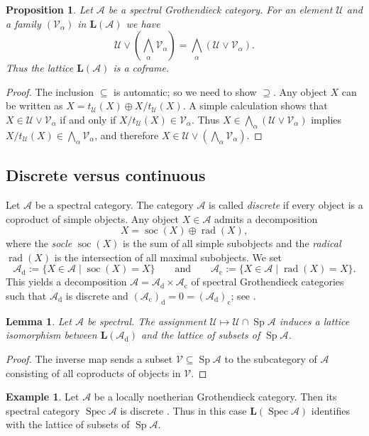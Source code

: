 \documentclass[a4paper]{amsart}
\theoremstyle{plain}
\newtheorem{prop}[thm]{Proposition}
\newtheorem{lem}[thm]{Lemma}
\theoremstyle{definition}
\newtheorem{exm}[thm]{Example}
\theoremstyle{remark}
\numberwithin{equation}{section}
\newcommand{\rad}{\operatorname{rad}}
\newcommand{\soc}{\operatorname{soc}}
\newcommand{\Sp}{\operatorname{Sp}}
\newcommand{\Spec}{\operatorname{Spec}}
\def\A{\mathcal A}
\def\U{\mathcal U}
\def\V{\mathcal V}
\def\bfL{\mathbf L}
\def\a{\alpha}
\begin{document}
\begin{prop}\label{pr:lattice-loc-spec}
  Let $\A$ be a spectral Grothendieck category. For an element $\U$ and a family $(\V_\a)$ in
  $\bfL(\A)$ we have
  \[
    \U\vee\left(\bigwedge_\a\V_\a\right)=\bigwedge_\a(\U\vee\V_\a).\]
  Thus the lattice $\bfL(\A)$ is a coframe.
\end{prop}
\begin{proof}
  The inclusion $\subseteq$ is automatic; so we need to show
  $\supseteq$. Any object $X$ can be written as
  $X=t_\U(X)\oplus X/t_\U(X)$. A simple calculation shows that
  $X\in\U\vee\V_\a$ if and only if $X/t_\U(X)\in\V_\a$. Thus
  $X\in\bigwedge_\a(\U\vee\V_\a)$ implies
  $X/t_\U(X)\in\bigwedge_\a\V_\a$, and therefore
  $X\in \U\vee\left(\bigwedge_\a\V_\a\right)$.
\end{proof}

\subsection*{Discrete versus continuous}

Let $\A$ be a spectral category. The category $\A$ is called
\emph{discrete} if every object is a coproduct of simple objects. Any
object $X\in\A$ admits a decomposition \[X=\soc(X)\oplus\rad(X),\] where the
\emph{socle} $\soc(X)$ is the sum of all simple subobjects and the
\emph{radical} $\rad(X)$ is the intersection of all maximal
subobjects. We set
\[\A_{\mathrm d}:=\{X\in\A\mid\soc(X)=X\}\qquad\text{and}\qquad
  \A_{\mathrm c}:=\{X\in\A\mid\rad(X)=X\}.\] This yields a
decomposition $\A=\A_{\mathrm d}\times \A_{\mathrm c}$ of spectral
Grothendieck categories such that $\A_{\mathrm d}$ is discrete and
$(\A_{\mathrm c})_{\mathrm d}=0=(\A_{\mathrm d})_{\mathrm c}$; see  \cite[\S3]{GO1966}.

\begin{lem}\label{le:discrete}
  Let $\A$ be spectral. The assignment $\U\mapsto\U\cap\Sp\A$ induces
  a lattice isomorphism between $\bfL(\A_{\mathrm d})$ and the lattice
  of subsets of $\Sp\A$.
\end{lem}
\begin{proof}
  The inverse map sends a subset $\V\subseteq\Sp\A$ to the subcategory
  of $\A$ consisting of all coproducts of objects in $\V$.
\end{proof}

\begin{exm}\label{ex:noeth}
  Let $\A$ be a locally noetherian Grothendieck category.  Then its
  spectral category $\Spec\A$ is discrete \cite[IV.2]{Ga1962}. Thus in
  this case $\bfL(\Spec\A)$ identifies with the lattice of subsets of
  $\Sp\A$.
\end{exm}
\end{document}
